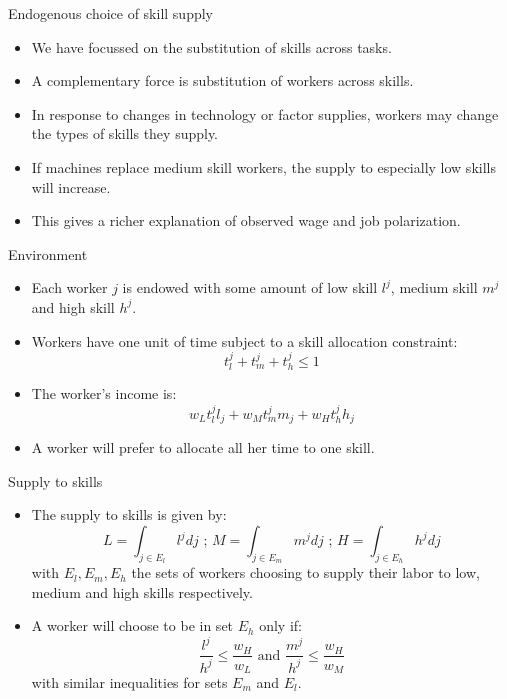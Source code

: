 \documentclass[notes=show]{beamer}
\begin{document}
\begin{frame}{Endogenous choice of skill supply}
\begin{itemize}
\item We have focussed on the substitution of skills across tasks. \medskip
\item A complementary force is substitution of workers across skills. \medskip
\item In response to changes in technology or factor supplies, workers may change the types of skills they supply. \medskip
\item If machines replace medium skill workers, the supply to especially low skills will increase. \medskip
\item This gives a richer explanation of observed wage and job polarization.
\end{itemize}
\end{frame}

\begin{frame}{Environment}
\begin{itemize}
\item Each worker $j$ is endowed with some amount of low skill $l^{j}$, medium skill $m^{j}$ and high skill $h^{j}$. \medskip
\item Workers have one unit of time subject to a skill allocation constraint:
\[
t_{l}^{j} + t_{m}^{j} + t_{h}^{j} \leqslant 1 
\]
\item The worker's income is:
\[
w_{L}t_{l}^{j}l_{j} + w_{M}t_{m}^{j}m_{j} + w_{H}t_{h}^{j}h_{j} 
\]
\item A worker will prefer to allocate all her time to one skill.
\end{itemize}
\end{frame}

\begin{frame}{Supply to skills}
\begin{itemize}
\item The supply to skills is given by:
\[
L = \int_{j \in E_{l}} l^{j}dj \text{  ;  } M = \int_{j \in E_{m}} m^{j}dj \text{  ;  } H = \int_{j \in E_{h}} h^{j}dj
\]
with $E_{l}, E_{m}, E_{h}$ the sets of workers choosing to supply their labor to low, medium and high skills respectively.
\item A worker will choose to be in set $E_{h}$ only if:
\[
\frac{l^{j}}{h^{j}} \leq \frac{w_{H}}{w_{L}} \text{ and } \frac{m^{j}}{h^{j}} \leq \frac{w_{H}}{w_{M}}
\]
with similar inequalities for sets $E_{m}$ and $E_{l}$.
\end{itemize}
\end{frame}
\end{document}
